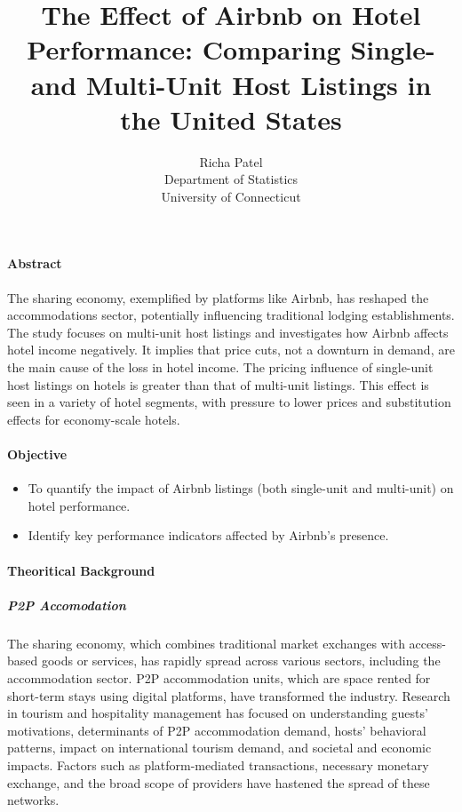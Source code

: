 \documentclass[12pt]{article}
\title{The Effect of Airbnb on Hotel Performance: Comparing Single- and Multi-Unit Host Listings in the United States }
\author{Richa Patel\\
Department of Statistics\\
University of Connecticut
}
\begin{document}
\maketitle 

\paragraph{Abstract}
The sharing economy, exemplified by platforms like Airbnb, has reshaped the accommodations sector, potentially influencing traditional lodging establishments. The study focuses on multi-unit host listings and investigates how Airbnb affects hotel income negatively. It implies that price cuts, not a downturn in demand, are the main cause of the loss in hotel income. The pricing influence of single-unit host listings on hotels is greater than that of multi-unit listings. This effect is seen in a variety of hotel segments, with pressure to lower prices and substitution effects for economy-scale hotels. 

\paragraph{Objective}

\begin{itemize}

\item To quantify the impact of Airbnb listings (both single-unit and multi-unit) on hotel performance.
\item Identify key performance indicators affected by Airbnb's presence.

\end{itemize}

\paragraph{Theoritical Background}

\subparagraph{P2P Accomodation}
The sharing economy, which combines traditional market exchanges with access-based goods or services, has rapidly spread across various sectors, including the accommodation sector. P2P accommodation units, which are space rented for short-term stays using digital platforms, have transformed the industry. Research in tourism and hospitality management has focused on understanding guests' motivations, determinants of P2P accommodation demand, hosts' behavioral patterns, impact on international tourism demand, and societal and economic impacts. Factors such as platform-mediated transactions, necessary monetary exchange, and the broad scope of providers have hastened the spread of these networks.
\end{document}
